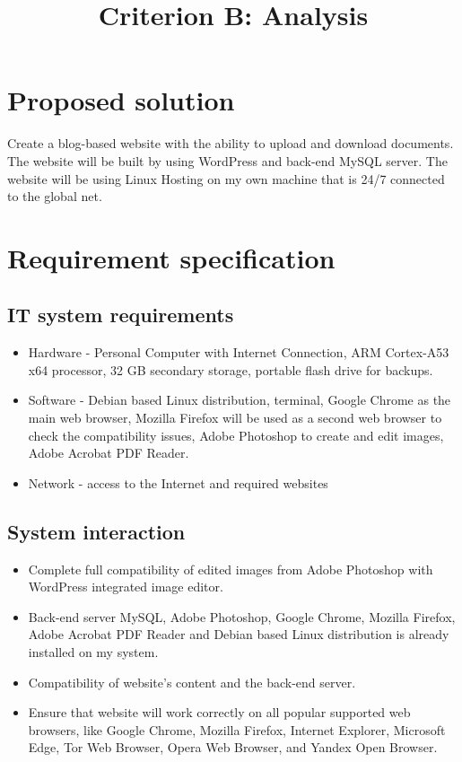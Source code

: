 \documentclass[a4paper, 12pt]{article}
\title{Criterion B: Analysis}
\date{}
\begin{document}
\maketitle

\section*{Proposed solution}

Create a blog-based website with the ability to upload and download documents. The website will be built by using WordPress and back-end MySQL server. The website will be using Linux Hosting on my own machine that is 24/7 connected to the global net. 
\section*{Requirement specification}

\subsection*{IT system requirements}

\begin{itemize}
    \item Hardware - Personal Computer with Internet Connection, ARM Cortex-A53 x64 processor, 32 GB secondary storage, portable flash drive for backups.
    \item Software - Debian based Linux distribution, terminal, Google Chrome as the main web browser, Mozilla Firefox will be used as a second web browser to check the compatibility issues, Adobe Photoshop to create and edit images, Adobe Acrobat PDF Reader.
    \item Network - access to the Internet and required websites 
\end{itemize}

\subsection*{System interaction}

\begin{itemize}
    \item Complete full compatibility of edited images from Adobe Photoshop with WordPress integrated image editor.
    \item Back-end server MySQL, Adobe Photoshop, Google Chrome, Mozilla Firefox, Adobe Acrobat PDF Reader and Debian based Linux distribution is already installed on my system.
    \item Compatibility of website’s content and the back-end server.
    \item Ensure that website will work correctly on all popular supported web browsers, like Google Chrome, Mozilla Firefox, Internet Explorer, Microsoft Edge, Tor Web Browser, Opera Web Browser, and Yandex Open Browser.
\end{itemize}
\end{document}

